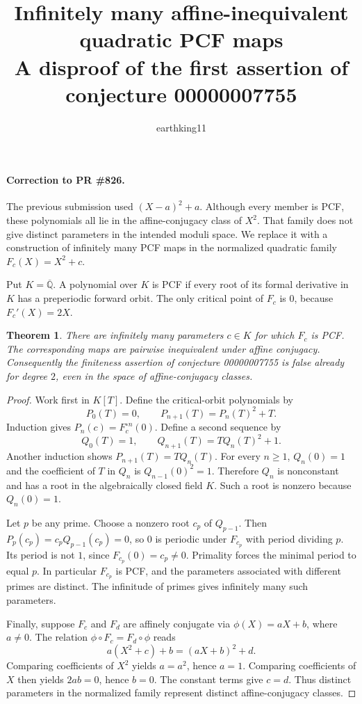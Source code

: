 \documentclass[11pt]{article}
\title{Infinitely many affine-inequivalent quadratic PCF maps\\
  A disproof of the first assertion of conjecture 00000007755}
\author{earthking11}
\date{}
\newtheorem{theorem}{Theorem}
\begin{document}
\maketitle

\paragraph{Correction to PR \#826.}
The previous submission used $(X-a)^2+a$. Although every member is PCF,
these polynomials all lie in the affine-conjugacy class of $X^2$. That family
does not give distinct parameters in the intended moduli space. We replace it
with a construction of infinitely many PCF maps in the normalized quadratic
family $F_c(X)=X^2+c$.

Put $K=\overline{\mathbb Q}$. A polynomial over $K$ is PCF if every root of
its formal derivative in $K$ has a preperiodic forward orbit. The only
critical point of $F_c$ is $0$, because $F_c'(X)=2X$.

\begin{theorem}
There are infinitely many parameters $c\in K$ for which $F_c$ is PCF.
The corresponding maps are pairwise inequivalent under affine conjugacy.
Consequently the finiteness assertion of conjecture 00000007755 is false
already for degree $2$, even in the space of affine-conjugacy classes.
\end{theorem}

\begin{proof}
Work first in $K[T]$. Define the critical-orbit polynomials by
\[
P_0(T)=0,\qquad P_{n+1}(T)=P_n(T)^2+T.
\]
Induction gives $P_n(c)=F_c^{\circ n}(0)$. Define a second sequence by
\[
Q_0(T)=1,\qquad Q_{n+1}(T)=TQ_n(T)^2+1.
\]
Another induction shows $P_{n+1}(T)=TQ_n(T)$. For every $n\geq1$,
$Q_n(0)=1$ and the coefficient of $T$ in $Q_n$ is $Q_{n-1}(0)^2=1$.
Therefore $Q_n$ is nonconstant and has a root in the algebraically closed
field $K$. Such a root is nonzero because $Q_n(0)=1$.

Let $p$ be any prime. Choose a nonzero root $c_p$ of $Q_{p-1}$. Then
$P_p(c_p)=c_pQ_{p-1}(c_p)=0$, so $0$ is periodic under $F_{c_p}$ with
period dividing $p$. Its period is not $1$, since $F_{c_p}(0)=c_p\neq0$.
Primality forces the minimal period to equal $p$. In particular $F_{c_p}$
is PCF, and the parameters associated with different primes are distinct.
The infinitude of primes gives infinitely many such parameters.

Finally, suppose $F_c$ and $F_d$ are affinely conjugate via
$\phi(X)=aX+b$, where $a\neq0$. The relation
$\phi\circ F_c=F_d\circ\phi$ reads
\[
a(X^2+c)+b=(aX+b)^2+d.
\]
Comparing coefficients of $X^2$ yields $a=a^2$, hence $a=1$.
Comparing coefficients of $X$ then yields $2ab=0$, hence $b=0$.
The constant terms give $c=d$. Thus distinct parameters in the normalized
family represent distinct affine-conjugacy classes.
\end{proof}
\end{document}
